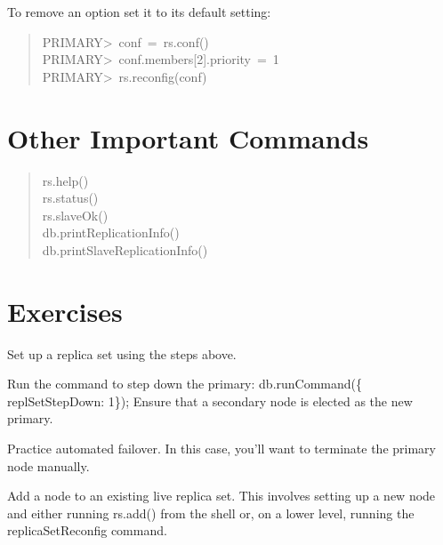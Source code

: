 \documentclass[letter]{article}
\begin{document}
To remove an option set it to its default setting:
%
\begin{quote}{\ttfamily \raggedright \noindent
PRIMARY>~conf~=~rs.conf()\\
PRIMARY>~conf.members{[}2{]}.priority~=~1\\
PRIMARY>~rs.reconfig(conf)
}
\end{quote}


\section{Other Important Commands%
  \label{other-important-commands}%
}
%
\begin{quote}{\ttfamily \raggedright \noindent
rs.help()\\
rs.status()\\
rs.slaveOk()\\
db.printReplicationInfo()\\
db.printSlaveReplicationInfo()
}
\end{quote}


\section{Exercises%
  \label{exercises}%
}
\begin{list}{.}
{
\setlength{\rightmargin}{\leftmargin}
}

\item Set up a replica set using the steps above.

\item Run the command to step down the primary: db.runCommand(\{ replSetStepDown: 1\}); Ensure that a secondary node is elected as the new primary.

\item Practice automated failover. In this case, you'll want to terminate the primary node manually.

\item Add a node to an existing live replica set. This involves setting up a new node and either running rs.add() from the shell or, on a lower level, running the replicaSetReconfig command.
\end{list}
\end{document}
